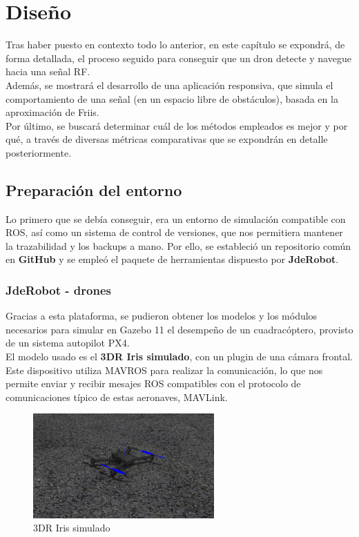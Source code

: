 \chapter{Diseño}
\label{cap:capitulo4}

Tras haber puesto en contexto todo lo anterior, en este capítulo se expondrá, de forma detallada, el proceso seguido para conseguir que un dron detecte y navegue hacia una señal \ac{RF}.\\

Además, se mostrará el desarrollo de una aplicación responsiva, que simula el comportamiento de una señal (en un espacio libre de obstáculos), basada en la aproximación de Friis.\\

Por último, se buscará determinar cuál de los métodos empleados es mejor y por qué, a través de diversas métricas comparativas que se expondrán en detalle posteriormente.\\

\section{Preparación del entorno}
\label{sec:preparacion_del_entorno}

Lo primero que se debía conseguir, era un entorno de simulación compatible con \ac{ROS}, así como un sistema de control de versiones, que nos permitiera mantener la trazabilidad y los backups a mano. Por ello, se estableció un repositorio común en \textbf{GitHub} y se empleó el paquete de herramientas dispuesto por \textbf{JdeRobot}.

\subsection{JdeRobot - drones}
\label{subsec:jderobot_drones}

Gracias a esta plataforma, se pudieron obtener los modelos y los módulos necesarios para simular en Gazebo 11 el desempeño de un cuadracóptero, provisto de un sistema autopilot PX4.\\
\newpage
El modelo usado es el \textbf{3DR Iris simulado}, con un plugin de una cámara frontal. Este dispositivo utiliza MAVROS para realizar la comunicación, lo que nos permite enviar y recibir mesajes ROS compatibles con el protocolo de comunicaciones típico de estas aeronaves, MAVLink.\\

\begin{figure} [H]
	\begin{center}
	\includegraphics[height=4cm]{imagenes/cap4/1_px4_drone_gz.png}
	\end{center}
	\caption[3DR Iris simulado]{3DR Iris simulado}
	\label{fig:3dr_iris}
\end{figure}

